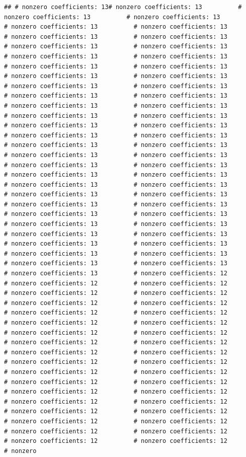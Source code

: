 \documentclass[
]{article}
\begin{document}
\begin{verbatim}
## # nonzero coefficients: 13# nonzero coefficients: 13          # nonzero coefficients: 13          # nonzero coefficients: 13          # nonzero coefficients: 13          # nonzero coefficients: 13          # nonzero coefficients: 13          # nonzero coefficients: 13          # nonzero coefficients: 13          # nonzero coefficients: 13          # nonzero coefficients: 13          # nonzero coefficients: 13          # nonzero coefficients: 13          # nonzero coefficients: 13          # nonzero coefficients: 13          # nonzero coefficients: 13          # nonzero coefficients: 13          # nonzero coefficients: 13          # nonzero coefficients: 13          # nonzero coefficients: 13          # nonzero coefficients: 13          # nonzero coefficients: 13          # nonzero coefficients: 13          # nonzero coefficients: 13          # nonzero coefficients: 13          # nonzero coefficients: 13          # nonzero coefficients: 13          # nonzero coefficients: 13          # nonzero coefficients: 13          # nonzero coefficients: 13          # nonzero coefficients: 13          # nonzero coefficients: 13          # nonzero coefficients: 13          # nonzero coefficients: 13          # nonzero coefficients: 13          # nonzero coefficients: 13          # nonzero coefficients: 13          # nonzero coefficients: 13          # nonzero coefficients: 13          # nonzero coefficients: 13          # nonzero coefficients: 13          # nonzero coefficients: 13          # nonzero coefficients: 13          # nonzero coefficients: 13          # nonzero coefficients: 13          # nonzero coefficients: 13          # nonzero coefficients: 13          # nonzero coefficients: 13          # nonzero coefficients: 13          # nonzero coefficients: 13          # nonzero coefficients: 13          # nonzero coefficients: 13          # nonzero coefficients: 13          # nonzero coefficients: 13          # nonzero coefficients: 13          # nonzero coefficients: 12          # nonzero coefficients: 12          # nonzero coefficients: 12          # nonzero coefficients: 12          # nonzero coefficients: 12          # nonzero coefficients: 12          # nonzero coefficients: 12          # nonzero coefficients: 12          # nonzero coefficients: 12          # nonzero coefficients: 12          # nonzero coefficients: 12          # nonzero coefficients: 12          # nonzero coefficients: 12          # nonzero coefficients: 12          # nonzero coefficients: 12          # nonzero coefficients: 12          # nonzero coefficients: 12          # nonzero coefficients: 12          # nonzero coefficients: 12          # nonzero coefficients: 12          # nonzero coefficients: 12          # nonzero coefficients: 12          # nonzero coefficients: 12          # nonzero coefficients: 12          # nonzero coefficients: 12          # nonzero coefficients: 12          # nonzero coefficients: 12          # nonzero coefficients: 12          # nonzero coefficients: 12          # nonzero coefficients: 12          # nonzero coefficients: 12          # nonzero coefficients: 12          # nonzero coefficients: 12          # nonzero coefficients: 12          # nonzero coefficients: 12          # nonzero 
\end{verbatim}
\end{document}
